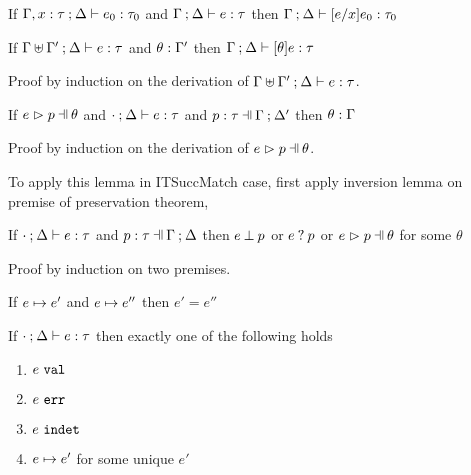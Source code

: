 \begin{lem}[Substitution]
  \label{lem:substitution}
  If $\Gamma, x : \tau \mathbin{;} \Delta \vdash e_0 : \tau_0$ and $\Gamma \mathbin{;} \Delta \vdash e : \tau$
  then $\Gamma \mathbin{;} \Delta \vdash [e/x]e_0 : \tau_0$
\end{lem}

\begin{lem}
  \label{lem:simult-substitution}
  If $\Gamma \uplus \Gamma' \mathbin{;} \Delta \vdash e : \tau$ and $\theta : \Gamma'$
  then $\Gamma \mathbin{;} \Delta \vdash [\theta]e : \tau$
\end{lem}
Proof by induction on the derivation of $\Gamma \uplus \Gamma' \mathbin{;} \Delta \vdash e : \tau$.

\begin{lem}
  \label{lem:subs-typing}
  If $\hpatmatch{e}{p}{\theta}$ and $\cdot \mathbin{;} \Delta \vdash e : \tau$ and $\hpattyp{p}{\tau}{\Gamma}{\Delta'}$
  then $\theta : \Gamma$
\end{lem}
Proof by induction on the derivation of $\hpatmatch{e}{p}{\theta}$.

To apply this lemma in ITSuccMatch case, first apply inversion lemma on premise of preservation theorem,

\begin{lem}
  \label{lem:match-progress}
  If $\cdot \mathbin{;} \Delta \vdash e : \tau$ and $\hpattyp{p}{\tau}{\Gamma}{\Delta}$
  then $e \mathbin{\bot} p$ or $e \mathbin{?} p$ or $\hpatmatch{e}{p}{\theta}$ for some $\theta$
\end{lem}
Proof by induction on two premises.

\begin{thm}
  \label{thrm:step-determinism}
  If $e \mapsto e'$ and $e \mapsto e''$ then $e' = e''$
\end{thm}

\begin{thm}[Determinism]
  \label{thrm:determinism}
  If $\cdot \mathbin{;} \Delta \vdash e : \tau$ then exactly one of the following holds
  \begin{enumerate}
    \item $e ~\mathtt{val}$
    \item $e ~\mathtt{err}$
    \item $e ~\mathtt{indet}$
    \item $e \mapsto e'$ for some unique $e'$
  \end{enumerate}
\end{thm}

